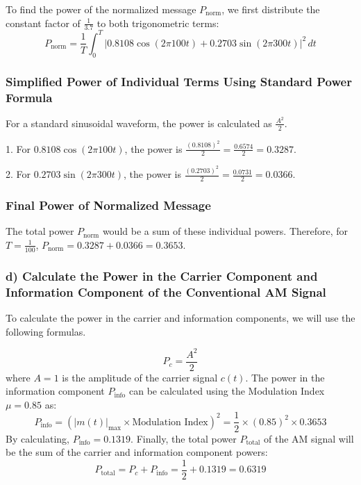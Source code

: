 \documentclass{article}
\begin{document}
To find the power of the normalized message \( P_{\text{norm}} \), we first distribute the constant factor of \( \frac{1}{3.7} \) to both trigonometric terms:
\[
P_{\text{norm}} = \frac{1}{T} \int_0^T \left| 0.8108\cos(2\pi 100t) + 0.2703\sin(2\pi 300t) \right|^2 \, dt
\]

\subsubsection*{Simplified Power of Individual Terms Using Standard Power Formula}

For a standard sinusoidal waveform, the power is calculated as \( \frac{A^2}{2} \).

1. For \( 0.8108\cos(2\pi 100t) \), the power is \( \frac{(0.8108)^2}{2} = \frac{0.6574}{2} = 0.3287 \).

2. For \( 0.2703\sin(2\pi 300t) \), the power is \( \frac{(0.2703)^2}{2} = \frac{0.0731}{2} = 0.0366 \).

\subsubsection*{Final Power of Normalized Message}

The total power \( P_{\text{norm}} \) would be a sum of these individual powers. Therefore, for \( T = \frac{1}{100} \), \( P_{\text{norm}} = 0.3287 + 0.0366 = 0.3653 \).

\subsubsection*{d) Calculate the Power in the Carrier Component and Information Component of the Conventional AM Signal}

To calculate the power in the carrier and information components, we will use the following formulas.

\begin{equation}
P_c = \frac{A^2}{2}
\end{equation}
where \( A = 1 \) is the amplitude of the carrier signal \( c(t) \).
\newline \newline
The power in the information component \( P_{\text{info}} \) can be calculated using the Modulation Index \( \mu = 0.85 \) as:
\begin{equation}
P_{\text{info}} = (|m(t)|_{\text{max}} \times \text{Modulation Index})^2 = \frac{1}{2} \times (0.85)^2 \times 0.3653 
\end{equation}
By calculating, \( P_{\text{info}} = 0.1319 \).
Finally, the total power \( P_{\text{total}} \) of the AM signal will be the sum of the carrier and information component powers:
\begin{equation}
P_{\text{total}} = P_c + P_{\text{info}} = \frac{1}{2} + 0.1319 = 0.6319
\end{equation}
\end{document}
